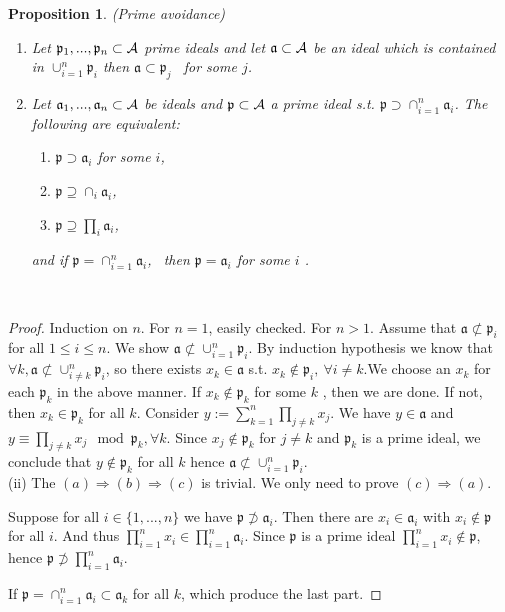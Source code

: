 \documentclass[11pt]{article}
\newtheorem{prop}[thm]{Proposition}
\newcommand{\sca}{{\mathfrak a}}
\newcommand{\scp}{{\mathfrak p}}
\newcommand{\cala}{{\cal A}}
\newcommand{\notsubset}{\not \subset}
\newcommand{\notsupset}{\not \supset}
\newcommand{\Lrta}{\Longrightarrow}
\begin{document}
\begin{prop}\label{prop:prime_avoidance}(Prime avoidance)
\begin{enumerate}[label=(\roman*)]
\item Let $\scp_1,..., \scp_n\subset \cala$ prime ideals and let $\sca \subset \cala$ be an ideal which is contained in $\cup_{i=1}^n\scp_i$ then $\sca\subset \scp_j$  for some $j$.\\
\item Let $\sca_1,...,\sca_n\subset \cala$ be ideals and $\scp \subset \cala$ a prime ideal s.t. $\scp \supset \cap_{i=1}^n\sca_i$.
The following are equivalent:
\begin{enumerate}[label=(\alph*)]
\item
$\scp\supset \sca_i$ for some $i$,
\item $\scp\supseteq \cap_i\sca_i$,
\item $\scp\supseteq\prod_i\sca_i$,
\end{enumerate}
and if $\scp=\cap_{i=1}^n\sca_i$,  then $\scp =\sca_i $ for some $i$ .
\end{enumerate}
\end{prop} 
\begin{proof}
Induction on $n$. For $n=1$, easily checked. For $n > 1$. Assume that $\sca \notsubset \scp_i$ 
for all $1\leq i\leq n$. We show $\sca\notsubset \cup_{i=1}^n\scp_i$.
By induction hypothesis we know that $\forall k,\sca\notsubset \cup_{i\neq k}^n\scp_i $, so there exists $x_k\in \sca$ s.t. $x_k\notin \scp_i,\ \forall i\neq k$.We choose an $x_k$ for each $\scp_k$ in the above manner.
If $x_k\notin \scp_k$ for some $k$ , then we are done.
If not, then $x_k\in \scp_k$ for all $k$. 
Consider $y:=\sum_{k=1}^n\prod_{j\neq k}x_j$. We have $y\in \sca$ and $y \equiv \prod_{j\neq k}x_j \mod \scp_k,\forall k$.
Since $x_j\notin \scp_k$ for $j\neq k$ and $\scp_k$ is a prime ideal, we conclude that $y\notin \scp_k$ for all $k$ hence $\sca\notsubset \cup_{i=1}^n \scp_i$.\\
(ii) The $(a)\Lrta (b)\Lrta (c)$ is trivial. We only need to prove $(c)\Lrta (a)$.

Suppose for all $i\in \{1,...,n\}$ we have $\scp\notsupset \sca_i$. Then there 
are $x_i\in\sca_i $ with $x_i\notin \scp$ for all $i$. 
And thus $\prod_{i=1}^n x_i\in \prod_{i=1}^n\sca_i$. 
Since $\scp$ is a prime ideal $\prod_{i=1}^n x_i\notin \scp$, hence $\scp\notsupset \prod_{i=1}^n \sca_i$.

If $\scp=\cap_{i=1}^n\sca_i\subset \sca_k$ for all $k$, which produce the last part.
\end{proof}
\end{document}
